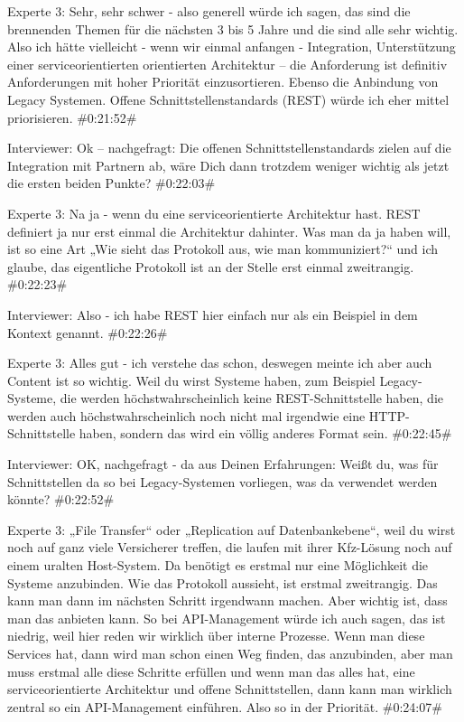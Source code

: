 Experte 3:
Sehr, sehr schwer - also generell würde ich sagen, das sind die brennenden Themen für die nächsten 3 bis 5 Jahre und die sind alle sehr wichtig. Also ich hätte vielleicht - wenn wir einmal anfangen - Integration, Unterstützung einer serviceorientierten orientierten Architektur – die Anforderung ist definitiv Anforderungen mit hoher Priorität einzusortieren. Ebenso die Anbindung von Legacy Systemen. Offene Schnittstellenstandards (REST) würde ich eher mittel priorisieren.
\#0:21:52\#

Interviewer:
Ok – nachgefragt: Die offenen Schnittstellenstandards zielen auf die Integration mit Partnern ab, wäre Dich dann trotzdem weniger wichtig als jetzt die ersten beiden Punkte?
\#0:22:03\#

Experte 3:
Na ja - wenn du eine serviceorientierte Architektur hast. REST definiert ja nur erst einmal die Architektur dahinter. Was man da ja haben will, ist so eine Art „Wie sieht das Protokoll aus, wie man kommuniziert?“ und ich glaube, das eigentliche Protokoll ist an der Stelle erst einmal zweitrangig.
\#0:22:23\#

Interviewer:
Also - ich habe REST hier einfach nur als ein Beispiel in dem Kontext genannt.
\#0:22:26\#

Experte 3:
Alles gut - ich verstehe das schon, deswegen meinte ich aber auch Content ist so wichtig. Weil du wirst Systeme haben, zum Beispiel Legacy-Systeme, die werden höchstwahrscheinlich keine REST-Schnittstelle haben, die werden auch höchstwahrscheinlich noch nicht mal irgendwie eine HTTP-Schnittstelle haben, sondern das wird ein völlig anderes Format sein.
\#0:22:45\#

Interviewer:
OK, nachgefragt - da aus Deinen Erfahrungen: Weißt du, was für Schnittstellen da so bei Legacy-Systemen vorliegen, was da verwendet werden könnte?
\#0:22:52\#

Experte 3:
„File Transfer“ oder „Replication auf Datenbankebene“, weil du wirst noch auf ganz viele Versicherer treffen, die laufen mit ihrer Kfz-Lösung noch auf einem uralten Host-System. Da benötigt es erstmal nur eine Möglichkeit die Systeme anzubinden. Wie das Protokoll aussieht, ist erstmal zweitrangig. Das kann man dann im nächsten Schritt irgendwann machen. Aber wichtig ist, dass man das anbieten kann. So bei API-Management würde ich auch sagen, das ist niedrig, weil hier reden wir wirklich über interne Prozesse. Wenn man diese Services hat, dann wird man schon einen Weg finden, das anzubinden, aber man muss erstmal alle diese Schritte erfüllen und wenn man das alles hat, eine serviceorientierte Architektur und offene Schnittstellen, dann kann man wirklich zentral so ein API-Management einführen. Also so in der Priorität.
\#0:24:07\#

